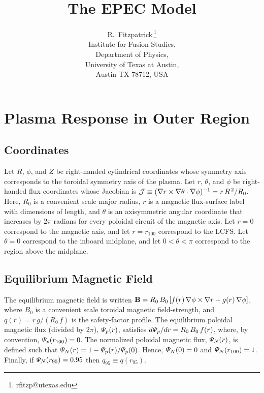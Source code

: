 \documentclass[notitlepage,12pt]{article}
\begin{document}
\title{\bf The EPEC Model}
\author{R.~Fitzpatrick\,\footnote{rfitzp@utexas.edu}\\
Institute for Fusion Studies,\\  Department of Physics,\\  University of Texas at Austin,\\  Austin TX 78712, USA}
\maketitle

\section{Plasma Response in Outer Region}
\subsection{Coordinates}\label{a1}
Let $R$, $\phi$, and $Z$ be right-handed cylindrical coordinates whose symmetry axis corresponds to
the toroidal symmetry axis of the plasma. Let $r$, $\theta$, and $\phi$ be right-handed flux coordinates
whose Jacobian is ${\cal J}\equiv (\nabla r \times \nabla\theta\cdot\nabla\phi)^{-1}=r\,R^{\,2}/R_0$. 
Here, $R_0$ is a convenient scale major radius, $r$ is a magnetic flux-surface label with dimensions of length,
and $\theta$ is an axisymmetric angular coordinate that increases by $2\pi$ radians for every poloidal circuit of the magnetic axis.
Let $r=0$ correspond to the magnetic axis, and let $r=r_{100}$ correspond to the LCFS. 
Let $\theta=0$ correspond to the inboard midplane, and let $0<\theta<\pi$ correspond to the region above the midplane.

\subsection{Equilibrium Magnetic Field}\label{a2}
The equilibrium magnetic field is written
${\bf B} = R_0\,B_0\left[f(r)\,\nabla\phi\times \nabla r + g(r)\,\nabla\phi\right]$, 
where $B_0$ is a convenient scale toroidal magnetic field-strength, and
$q(r) = r\,g/(R_0\,f)$
is the safety-factor profile. The equilibrium poloidal magnetic flux (divided by $2\pi$), ${\mit\Psi}_p(r)$,
satisfies $d{\mit\Psi}_p/dr = R_0\,B_0\,f(r)$, where, by convention, ${\mit\Psi}_p(r_{100})=0$. The
normalized poloidal magnetic flux, ${\mit\Psi}_N(r)$, is defined such that
${\mit\Psi}_N(r) = 1-{\mit\Psi}_p(r)/{\mit\Psi}_p(0)$. Hence, ${\mit\Psi}_N(0)=0$ and
${\mit\Psi}_N(r_{100})=1$. Finally, if ${\mit\Psi}_N(r_{95})=0.95$ then $q_{95}\equiv q(r_{95})$. 
\end{document}
